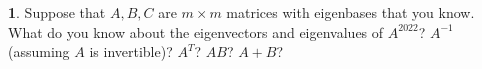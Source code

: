 \documentclass{article}
\theoremstyle{definition}
\newtheorem{prob}{}
\begin{document}
	\begin{prob}
	Suppose that $A, B, C$ are $m \times m$ matrices with eigenbases that you know.
 What do you know about the eigenvectors and eigenvalues of $A^{2022}$? $A^{-1}$ (assuming $A$ is invertible)? $A^T$? $AB$? $A+B$?

	\end{prob}

%	
\end{document}
